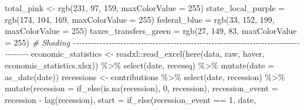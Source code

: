 \documentclass[
]{article}
\newenvironment{Shaded}{\begin{snugshade}}{\end{snugshade}}
\newcommand{\AttributeTok}[1]{\textcolor[rgb]{0.77,0.63,0.00}{#1}}
\newcommand{\CommentTok}[1]{\textcolor[rgb]{0.56,0.35,0.01}{\textit{#1}}}
\newcommand{\DecValTok}[1]{\textcolor[rgb]{0.00,0.00,0.81}{#1}}
\newcommand{\FunctionTok}[1]{\textcolor[rgb]{0.00,0.00,0.00}{#1}}
\newcommand{\NormalTok}[1]{#1}
\newcommand{\OtherTok}[1]{\textcolor[rgb]{0.56,0.35,0.01}{#1}}
\newcommand{\SpecialCharTok}[1]{\textcolor[rgb]{0.00,0.00,0.00}{#1}}
\newcommand{\StringTok}[1]{\textcolor[rgb]{0.31,0.60,0.02}{#1}}
\begin{document}
\begin{Shaded}
\begin{Highlighting}[]
\NormalTok{total\_pink }\OtherTok{\textless{}{-}} \FunctionTok{rgb}\NormalTok{(}\DecValTok{231}\NormalTok{, }\DecValTok{97}\NormalTok{, }\DecValTok{159}\NormalTok{, }\AttributeTok{maxColorValue =} \DecValTok{255}\NormalTok{)}
\NormalTok{state\_local\_purple }\OtherTok{=} \FunctionTok{rgb}\NormalTok{(}\DecValTok{174}\NormalTok{, }\DecValTok{104}\NormalTok{, }\DecValTok{169}\NormalTok{,  }\AttributeTok{maxColorValue =} \DecValTok{255}\NormalTok{)}
\NormalTok{federal\_blue }\OtherTok{=} \FunctionTok{rgb}\NormalTok{(}\DecValTok{33}\NormalTok{, }\DecValTok{152}\NormalTok{, }\DecValTok{199}\NormalTok{,  }\AttributeTok{maxColorValue =} \DecValTok{255}\NormalTok{)}
\NormalTok{taxes\_transfers\_green }\OtherTok{=} \FunctionTok{rgb}\NormalTok{(}\DecValTok{27}\NormalTok{, }\DecValTok{149}\NormalTok{, }\DecValTok{83}\NormalTok{,  }\AttributeTok{maxColorValue =} \DecValTok{255}\NormalTok{)}
\CommentTok{\# Shading {-}{-}{-}{-}{-}{-}{-}{-}{-}{-}{-}{-}{-}{-}{-}{-}{-}{-}{-}{-}{-}{-}{-}{-}{-}{-}{-}{-}{-}{-}{-}{-}{-}{-}{-}{-}{-}{-}{-}{-}{-}{-}{-}{-}{-}{-}{-}{-}{-}{-}{-}{-}{-}{-}{-}{-}{-}{-}{-}{-}{-}{-}{-}{-}{-}{-}{-}{-}{-}{-}{-}{-}{-}{-}{-}{-}{-}{-}{-}{-}{-}{-}{-}{-}{-}}
\NormalTok{economic\_statistics }\OtherTok{\textless{}{-}} 
\NormalTok{  readxl}\SpecialCharTok{::}\FunctionTok{read\_excel}\NormalTok{(}\FunctionTok{here}\NormalTok{(}\StringTok{\textquotesingle{}data\textquotesingle{}}\NormalTok{, }\StringTok{\textquotesingle{}raw\textquotesingle{}}\NormalTok{, }\StringTok{\textquotesingle{}haver\textquotesingle{}}\NormalTok{, }\StringTok{\textquotesingle{}economic\_statistics.xlsx\textquotesingle{}}\NormalTok{)) }\SpecialCharTok{\%\textgreater{}\%}
  \FunctionTok{select}\NormalTok{(date, recessq) }\SpecialCharTok{\%\textgreater{}\%}
  \FunctionTok{mutate}\NormalTok{(}\AttributeTok{date =} \FunctionTok{as\_date}\NormalTok{(date))}
\NormalTok{recessions }\OtherTok{\textless{}{-}}
\NormalTok{  contributions }\SpecialCharTok{\%\textgreater{}\%} 
  \FunctionTok{select}\NormalTok{(date, recession) }\SpecialCharTok{\%\textgreater{}\%}
  \FunctionTok{mutate}\NormalTok{(}\AttributeTok{recession =} \FunctionTok{if\_else}\NormalTok{(}\FunctionTok{is.na}\NormalTok{(recession),}
                             \DecValTok{0}\NormalTok{,}
\NormalTok{                             recession),}
         \AttributeTok{recession\_event =}\NormalTok{ recession }\SpecialCharTok{{-}} \FunctionTok{lag}\NormalTok{(recession),}
         \AttributeTok{start =} \FunctionTok{if\_else}\NormalTok{(recession\_event }\SpecialCharTok{==} \DecValTok{1}\NormalTok{, }
\NormalTok{                         date,}

\end{Highlighting}
\end{Shaded}
\end{document}
